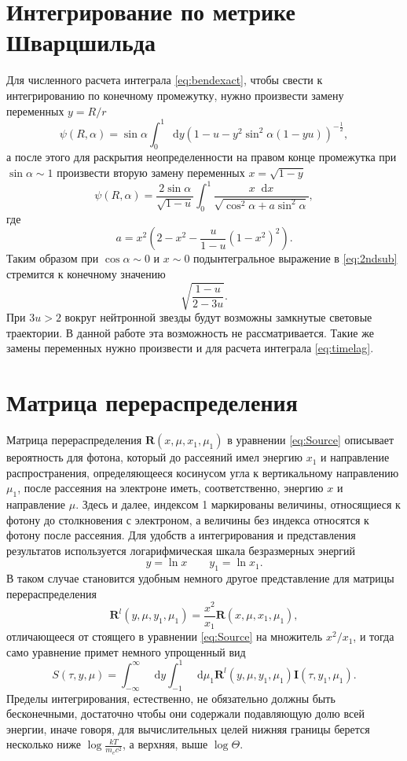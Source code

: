 \documentclass[14pt,a4paper]{extarticle}
\newcommand{\be}{\begin{equation}}
\newcommand{\ee}{\end{equation}}
\newcommand*\df {\mathop{}\!\mathrm{d}}
\begin{document}
		


		\newpage
	
	
	\appendix
		
	\newpage

		\section{Интегрирование по метрике Шварцшильда}\label{app:exact}
			Для численного расчета интеграла \eqref{eq:bendexact}, чтобы свести к интегрированию по конечному промежутку, нужно произвести замену переменных $y=R/r$
			\be
			\psi (R,\alpha) = \sin\alpha\int_0^1\df y {\left(1-u-y^2\sin^2\alpha(1-yu)\right)^{-\frac12}},
			\ee
			а после этого для раскрытия неопределенности на правом конце промежутка при $\sin \alpha \sim 1$ произвести вторую замену переменных $x=\sqrt{1-y}$
			\be\label{eq:2ndsub}
			\psi (R,\alpha) = \frac{2\sin\alpha}{\sqrt{1-u}}\int_0^1\frac{x\df x}{\sqrt{\cos^2\alpha+a\sin^2\alpha}},
			\ee
			где  
			\be
				a=x^2\left(2-x^2-\frac{u}{1-u}\left(1-x^2\right)^2\right).
			\ee
			Таким образом при $\cos\alpha\sim 0$ и $x \sim 0$ подынтегральное выражение в \eqref{eq:2ndsub} стремится к конечному значению \be
				\sqrt{\frac{1-u}{2-3u}}.
			\ee
			При $3u>2$ вокруг нейтронной звезды будут возможны замкнутые световые траектории. В данной работе эта возможность не рассматривается.
			Такие же замены переменных нужно произвести и для расчета интеграла \eqref{eq:timelag}.
	
	\newpage
		\section{Матрица перераспределения} \label{redistr}

			Матрица перераспределения $\bm{R}(x,\mu,x_1,\mu_1)$
			в уравнении \eqref{eq:Source}
			описывает вероятность для фотона, который до рассеяний имел энергию $x_1$ и направление распространения, определяющееся косинусом угла к вертикальному направлению $\mu_1$, после рассеяния на электроне иметь, соответственно, энергию $x$  и направление $\mu$.  
			Здесь и далее, индексом 1 маркированы величины, относящиеся к фотону до столкновения с электроном, а величины без индекса относятся к фотону после рассеяния.
			Для удобств	а интегрирования и представления результатов используется логарифмическая шкала безразмерных энергий 
			\be
			y=\ln x \qquad {y_1}=\ln x_1.
			\ee
			В таком случае становится удобным немного другое представление для матрицы перераспределения  
			\be
			\bm{R}^l(y,\mu,y_1,\mu_1)=\frac{x^2}{x_1}\bm{R}(x,\mu,x_1,\mu_1), \ee
			отличающееся от стоящего в уравнении \eqref{eq:Source} на множитель $x^2/x_1$, и тогда само уравнение примет немного упрощенный вид 
			\be
			S(\tau,y,\mu)= \int_{-\infty}^\infty \df y \int_{-1}^1 \df \mu_1 
			\bm{R}^l(y,\mu,y_1,\mu_1)\bm{I}(\tau,y_1,\mu_1).
			\ee
			Пределы интегрирования, естественно, не обязательно должны быть бесконечными, достаточно чтобы они содержали
			подавляющую долю всей энергии, иначе говоря, для вычислительных целей нижняя границы берется несколько ниже  $\log\frac{kT}{m_ec^2}$, а верхняя, выше $\log\Theta$.
\end{document}
